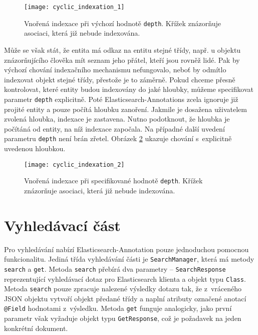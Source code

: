 \documentclass[11pt,oneside]{fithesis2}
\begin{document}
\begin{figure}[htb]
	\begin{center}
		\texttt{[image: cyclic\_indexation\_1]}
	\end{center}
	\caption{Vnořená indexace při výchozí hodnotě \texttt{depth}. Křížek znázorňuje asociaci, která již nebude indexována.}	
	\label{CyclicIndexation1}
\end{figure}

Může se však stát, že entita má odkaz na entitu stejné třídy, např. u objektu znázorňujícího člověka mít seznam jeho přátel, kteří jsou rovněž lidé. Pak by výchozí chování indexačního mechanismu nefungovalo, neboť by odmítlo indexovat objekt stejné třídy, přestože je to záměrně. Pokud chceme přesně kontrolovat, které entity budou indexovány do jaké hloubky, můžeme specifikovat parametr \texttt{depth} explicitně. Poté Elasticsearch-Annotations zcela ignoruje již projité entity a pouze počítá hloubku zanoření. Jakmile je dosažena uživatelem zvolená hloubka, indexace je zastavena. Nutno podotknout, že hloubka je počítáná od entity, na níž indexace započala. Na případné další uvedení parametru \texttt{depth}  není brán zřetel. Obrázek \ref{CyclicIndexation2} ukazuje chování s~explicitně uvedenou hloubkou.

\begin{figure}[htb]
	\begin{center}
		\texttt{[image: cyclic\_indexation\_2]}
	\end{center}
	\caption{Vnořená indexace při specifikované hodnotě \texttt{depth}.  Křížek znázorňuje asociaci, která již nebude indexována.}	
	\label{CyclicIndexation2}
\end{figure}

\section{Vyhledávací část}
Pro vyhledávání nabízí Elasticsearch-Annotation pouze jednoduchou pomocnou funkcionalitu. Jediná třída vyhledávání části je \texttt{SearchManager}, která má metody \texttt{search} a \texttt{get}. Metoda \texttt{search} přebírá dva parametry -- \texttt{SearchResponse} reprezentující vyhledávací dotaz pro Elasticsearch klienta a objekt typu \texttt{Class}. Metoda \texttt{search} pouze zpracuje nalezené výsledky dotazu tak, že z~vráceného JSON objektu vytvoří objekt předané třídy a naplní atributy označené anotací \texttt{@Field} hodnotami z~výsledku. Metoda \texttt{get} funguje analogicky, jako první parametr však vyžaduje objekt typu \texttt{GetResponse}, což je požadavek na jeden konkrétní dokument.
\end{document}
